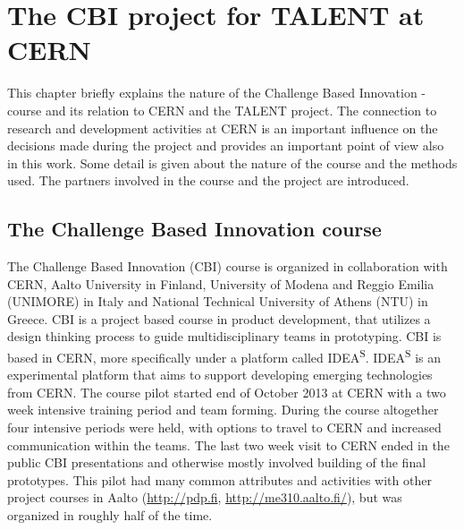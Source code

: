 \documentclass[english,12pt,a4paper,pdftex]{article}
\begin{document}
\clearpage



\section{The CBI project for TALENT at CERN}

This chapter briefly explains the nature of the Challenge Based Innovation -course and its relation to CERN and the TALENT project. The connection to research and development activities at CERN is an important influence on the decisions made during the project and provides an important point of view also in this work. Some detail is given about the nature of the course and the methods used. The partners involved in the course and the project are introduced. 


\subsection{The Challenge Based Innovation course}

The Challenge Based Innovation (CBI) course is organized in collaboration with CERN, Aalto University in Finland, University of Modena and Reggio Emilia (UNIMORE) in Italy and National Technical University of Athens (NTU) in Greece. CBI is a project based course in product development, that utilizes a design thinking process to guide multidisciplinary teams in prototyping. CBI is based in CERN, more specifically under a platform called IDEA\textsuperscript{S}. IDEA\textsuperscript{S} is an experimental platform that aims to support developing emerging technologies from CERN. The course pilot started end of October 2013 at CERN with a two week intensive training period and team forming. During the course altogether four intensive periods were held, with options to travel to CERN and increased communication within the teams. The last two week visit to CERN ended in the public CBI presentations and otherwise mostly involved building of the final prototypes. This pilot had many common attributes and activities with other project courses in Aalto (\url{http://pdp.fi}, \url{http://me310.aalto.fi/}), but was organized in roughly half of the time.
\end{document}
